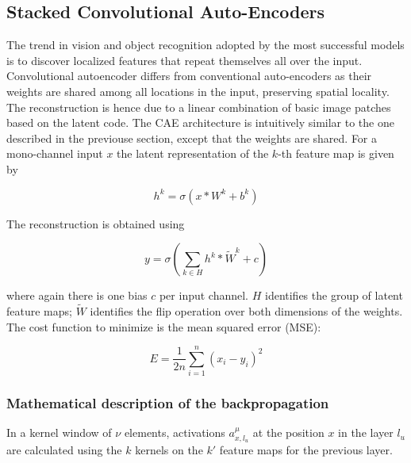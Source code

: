 \documentclass[final, paper=letter,5p,times,twocolumn]{elsarticle}
\begin{document}
\subsection{Stacked Convolutional Auto-Encoders}

The trend in vision and object recognition adopted by the most successful models is to discover localized features that repeat themselves all over the input. Convolutional autoencoder differs from conventional auto-encoders as their weights are shared among all locations in the input, preserving spatial locality. The reconstruction is hence due to a linear combination of basic image patches based on the latent code. The CAE architecture is intuitively similar to the one described in the previouse section, except that the weights are shared. For a mono-channel input $x$ the latent representation of the $k$-th feature map is given by

\begin{equation*}
h^{k} = \sigma(x*W^{k} + b^{k})
\end{equation*}

The reconstruction is obtained using

\begin{equation*}
y = \sigma \left(\sum_{k \in H} h^{k}*\tilde{W}^{k} + c \right)
\end{equation*}

where again there is one bias $c$ per input channel. $H$ identifies the group of latent feature maps; $\tilde{W}$ identifies the flip operation over both dimensions of the weights. The cost function to minimize is the mean squared error (MSE):

\begin{equation*}
E= \frac{1}{2n} \sum_{i=1}^{n} ( x_{i} - y_{i})^{2}
\end{equation*}

\subsubsection{Mathematical description of the backpropagation}

In a kernel window of $\nu$ elements, activations $a_{x,l_{u}}^{\mu}$ at the position $x$ in the layer $l_{u}$ are calculated using the $k$ kernels on the $k'$ feature maps for the previous layer.
\end{document}
